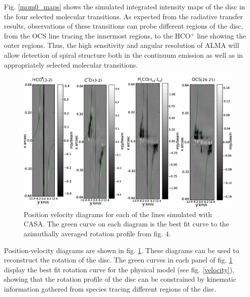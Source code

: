 \documentclass[useAMS,usenatbib]{mn2e}
\begin{document}
Fig. \ref{mom0_maps} shows the simulated integrated intensity maps of the disc in the four selected molecular transitions. As expected from the radiative transfer results, observations of these transitions can probe different regions of the disc, from the OCS line tracing the innermost regions, to the HCO$^+$ line showing the outer regions. Thus, the high sensitivity and angular resolution of ALMA will allow detection of spiral structure both in the continuum emission as well as  in appropriately selected molecular transitions.\smallskip

\begin{figure}
 \includegraphics[width=180mm]{Figures/sim/casa_all_30deg_PV_rotCurve_small2.eps}
 \caption{Position velocity diagrams for each of the lines simulated with CASA. The green curve on each diagram is the best fit curve to the azimuthally averaged rotation profile from fig. 4.}
 \label{pvs}
\end{figure}

Position-velocity diagrams are shown in fig. \ref{pvs}. These diagrams can be used to reconstruct the rotation of the disc. The green curves in each panel of fig. \ref{pvs} display the best fit rotation curve for the physical model (see fig. \ref{velocity}), showing that the rotation profile of the disc can be constrained by kinematic information gathered from species tracing different regions of the disc.\smallskip
\end{document}
